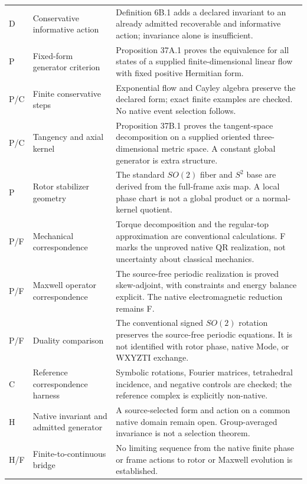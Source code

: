 \begin{longtable}{@{}p{}p{}p{}@{}}
D & Conservative informative action & Definition 6B.1 adds a declared invariant to an already admitted recoverable and informative action; invariance alone is insufficient. \\
P & Fixed-form generator criterion & Proposition 37A.1 proves the equivalence for all states of a supplied finite-dimensional linear flow with fixed positive Hermitian form. \\
P/C & Finite conservative steps & Exponential flow and Cayley algebra preserve the declared form; exact finite examples are checked. No native event selection follows. \\
P/C & Tangency and axial kernel & Proposition 37B.1 proves the tangent-space decomposition on a supplied oriented three-dimensional metric space. A constant global generator is extra structure. \\
P & Rotor stabilizer geometry & The standard $SO(2)$ fiber and $S^2$ base are derived from the full-frame axis map. A local phase chart is not a global product or a normal-kernel quotient. \\
P/F & Mechanical correspondence & Torque decomposition and the regular-top approximation are conventional calculations. F marks the unproved native QR realization, not uncertainty about classical mechanics. \\
P/F & Maxwell operator correspondence & The source-free periodic realization is proved skew-adjoint, with constraints and energy balance explicit. The native electromagnetic reduction remains F. \\
P/F & Duality comparison & The conventional signed $SO(2)$ rotation preserves the source-free periodic equations. It is not identified with rotor phase, native Mode, or WXYZTI exchange. \\
C & Reference correspondence harness & Symbolic rotations, Fourier matrices, tetrahedral incidence, and negative controls are checked; the reference complex is explicitly non-native. \\
H & Native invariant and admitted generator & A source-selected form and action on a common native domain remain open. Group-averaged invariance is not a selection theorem. \\
H/F & Finite-to-continuous bridge & No limiting sequence from the native finite phase or frame actions to rotor or Maxwell evolution is established. \\


\end{longtable}

